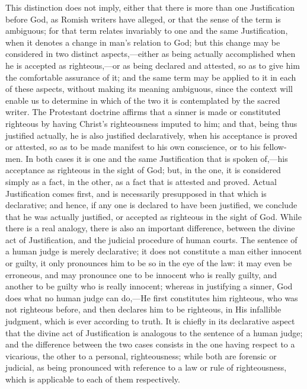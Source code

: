 \documentclass[
]{book}
\begin{document}
This distinction does not imply, either that there is more than one Justification before God, as Romish writers have alleged, or that the sense of the term is ambiguous; for that term relates invariably to one and the same Justification, when it denotes a change in man's relation to God; but this change may be considered in two distinct aspects,---either as being actually accomplished when he is accepted as righteous,---or as being declared and attested, so as to give him the comfortable assurance of it; and the same term may be applied to it in each of these aspects, without making its meaning ambiguous, since the context will enable us to determine in which of the two it is contemplated by the sacred writer. The Protestant doctrine affirms that a sinner is made or constituted righteous by having Christ's righteousness imputed to him; and that, being thus justified actually, he is also justified declaratively, when his acceptance is proved or attested, so as to be made manifest to his own conscience, or to his fellow-men. In both cases it is one and the same Justification that is spoken of,---his acceptance as righteous in the sight of God; but, in the one, it is considered simply as a fact, in the other, as a fact that is attested and proved. Actual Justification comes first, and is necessarily presupposed in that which is declarative; and hence, if any one is declared to have been justified, we conclude that he was actually justified, or accepted as righteous in the sight of God. While there is a real analogy, there is also an important difference, between the divine act of Justification, and the judicial procedure of human courts. The sentence of a human judge is merely declarative; it does not constitute a man either innocent or guilty, it only pronounces him to be so in the eye of the law: it may even be erroneous, and may pronounce one to be innocent who is really guilty, and another to be guilty who is really innocent; whereas in justifying a sinner, God does what no human judge can do,---He first constitutes him righteous, who was not righteous before, and then declares him to be righteous, in His infallible judgment, which is ever according to truth. It is chiefly in its declarative aspect that the divine act of Justification is analogous to the sentence of a human judge; and the difference between the two cases consists in the one having respect to a vicarious, the other to a personal, righteousness; while both are forensic or judicial, as being pronounced with reference to a law or rule of righteousness, which is applicable to each of them respectively.
\end{document}
